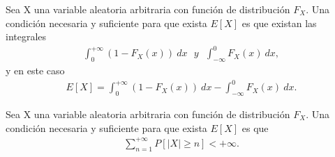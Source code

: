 \begin{teo}
Sea X una variable aleatoria arbitraria con función de distribución $F_X$. Una condición necesaria y suficiente para que exista $E[X]$ es que existan las integrales
\begin{align*}
    \int_{0}^{+\infty}{(1 - F_X(x)) \ dx} \ \ \ y \ \ \ \int_{-\infty}^{0}{F_X(x) \ dx},
\end{align*}
y en este caso
\begin{align*}
    E[X] = \int_{0}^{+\infty}{(1 - F_X(x)) \ dx} - \int_{-\infty}^{0}{F_X(x) \ dx}.
\end{align*}
\end{teo}

\begin{teo}
Sea X una variable aleatoria arbitraria con función de distribución $F_X$. Una condición necesaria y suficiente para que exista $E[X]$ es que
\begin{align*}
    \sum_{n=1}^{+\infty}{P[|X|\ge n]} < +\infty.
\end{align*}
\end{teo}